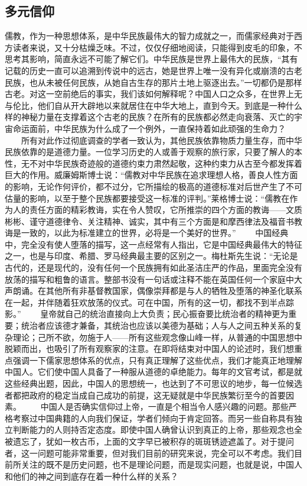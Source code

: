 \documentclass[12pt,oneside]{book}
\begin{document}
\begin{common-format}
\chapter{多元信仰}
儒教，作为一种思想体系，是中华民族最伟大的智力成就之一，而儒家经典对于西方读者来说，又十分枯燥乏味。不过，仅仅仔细地阅读，只能得到皮毛的印象，不思考其影响，简直永远不可能了解它们。中华民族是世界上最伟大的民族，“其有记载的历史一直可以追溯到传说中的远古，她是世界上唯一没有异化或崩溃的古老民族，也从未被任何民族，从她自古生存的那片土地上驱逐出去。”一切都仍是那样古老。对这一空前绝后的事实，我们该如何解释呢？中国人口之众多，在世界上无与伦比，他们自从开大辟地以来就居住在中华大地上，直到今天。到底是一种什么样的神秘力量在支撑着这个古老的民族？在所有的民族都必然走向衰落、灭亡的宇宙命运面前，中华民族为什么成了一个例外，一直保持着如此顽强的生命力？ 
　　所有对此作过彻底调查的学者一致认为，其他民族依靠物质力量生存，而中华民族依靠的是道德力量。一位学习历史的人或善于观察的旅行家，只要了解人的本性，无不对中华民族奇迹般的道德约束力肃然起敬，这种约束力从古至今都发挥着巨大的作用。威廉姆斯博士说：“儒教对中华民族在追求理想人格，善良人性方面的影响，无论作何评价，都不过分，它所描绘的极高的道德标准对后世产生了不可估量的影响，以至于整个民族都要接受这一标准的评判。”莱格博士说：“儒教在作为人的责任方面的精彩教诲，实在令人赞叹，它所推崇的四个方面的教诲——文质彬彬、谨守道德律令、关注精神、诚实，其中有三个方面是和摩西律法及福音书教诲是一致的，以此为标准建立的世界，必将是一个美好的世界。” 
　　中国经典中，完全没有使人堕落的描写，这一点经常有人指出，它是中国经典最伟大的特征之一，也是与印度、希腊、罗马经典最主要的区别之一。梅杜斯先生说：“无论是古代的，还是现代的，没有任何一个民族拥有如此圣洁庄严的作品，里面完全没有放荡的描写和粗鲁的语言。整部书没有一句话或注释不能在英国任何一个家庭中大声朗诵。在其他所有非基督教国家，偶像崇拜都是与人的牺牲及堕落的神圣化联系在一起，并伴随着狂欢放荡的仪式。可在中国，所有的这一切，都找不到半点踪影。” 
　　皇帝就自己的统治直接向上大负责；民心振奋要比统治者的精神更为重要；统治者应该德才兼备，其统治也应该以美德为基础；人与人之间五种关系的复杂理论；己所不欲，勿施于人——所有这些观念像山峰一样，从普通的中国思想中脱颖而出，也吸引了所有观察家的注意。在即将结束对中国人的论述时，我们想重点强调一下儒家思想体系的优点，只有真正理解了这些优点，我们才能真正地理解中国人。它们使中国人具备了一种服从道德的卓绝能力。每年的文官考试，都是就这些经典出题，因此，中国人的思想统一，也达到了不可思议的地步，每一位候选者都把政府的稳定当成自己成功的前提，这无疑就是中华民族繁衍至今的首要因素。 
　　中国人是否确实信仰过上帝，一直是个相当令人感兴趣的问题。那些严格考察过中国典籍的人向我们保证，学者们倾向于肯定回答。而另一些自称具有独立判断能力的人则持否定态度。即使中国人确曾认识到真正的上帝，那些观念也全被遗忘了，犹如一枚古币，上面的文字早已被积存的斑斑锈迹遮盖了。对于提问者，这一问题可能非常重要，但对我们目前的研究来说，完全可以不考虑。我们目前所关注的既不是历史问题，也不是理论问题，而是现实问题，也就是说，中国人和他们的神之间到底存在着一种什么样的关系？ 

\end{common-format}
\end{document}
